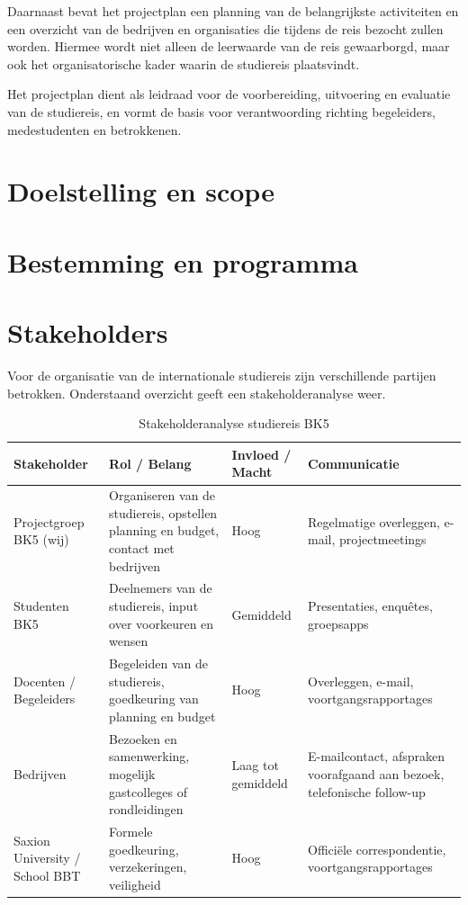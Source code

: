 \documentclass{BK5}
\begin{document}
	Daarnaast bevat het projectplan een planning van de belangrijkste activiteiten en een overzicht van de bedrijven en organisaties die tijdens de reis bezocht zullen worden. Hiermee wordt niet alleen de leerwaarde van de reis gewaarborgd, maar ook het organisatorische kader waarin de studiereis plaatsvindt.
	
	Het projectplan dient als leidraad voor de voorbereiding, uitvoering en evaluatie van de studiereis, en vormt de basis voor verantwoording richting begeleiders, medestudenten en betrokkenen.
	
	\section{Doelstelling en scope}
	
	\section{Bestemming en programma}
	
	\section{Stakeholders}
	
	Voor de organisatie van de internationale studiereis zijn verschillende partijen betrokken. Onderstaand overzicht geeft een stakeholderanalyse weer.
	
	\begin{table}[h!]
		\centering
		\caption{Stakeholderanalyse studiereis BK5}
		\label{tab:stakeholders}
		\begin{tabular}{|l|p{4.5cm}|l|p{4.5cm}|}
			\hline
			\textbf{Stakeholder} & \textbf{Rol / Belang} & \textbf{Invloed / Macht} & \textbf{Communicatie} \\
			\hline
			Projectgroep BK5 (wij) & Organiseren van de studiereis, opstellen planning en budget, contact met bedrijven & Hoog & Regelmatige overleggen, e-mail, projectmeetings \\
			\hline
			Studenten BK5 & Deelnemers van de studiereis, input over voorkeuren en wensen & Gemiddeld & Presentaties, enquêtes, groepsapps \\
			\hline
			Docenten / Begeleiders & Begeleiden van de studiereis, goedkeuring van planning en budget & Hoog & Overleggen, e-mail, voortgangsrapportages \\
			\hline
			Bedrijven & Bezoeken en samenwerking, mogelijk gastcolleges of rondleidingen & Laag tot gemiddeld & E-mailcontact, afspraken voorafgaand aan bezoek, telefonische follow-up \\
			\hline
			Saxion University / School BBT & Formele goedkeuring, verzekeringen, veiligheid & Hoog & Officiële correspondentie, voortgangsrapportages \\
			\hline
		\end{tabular}
		
	\end{table}
	
\end{document}
